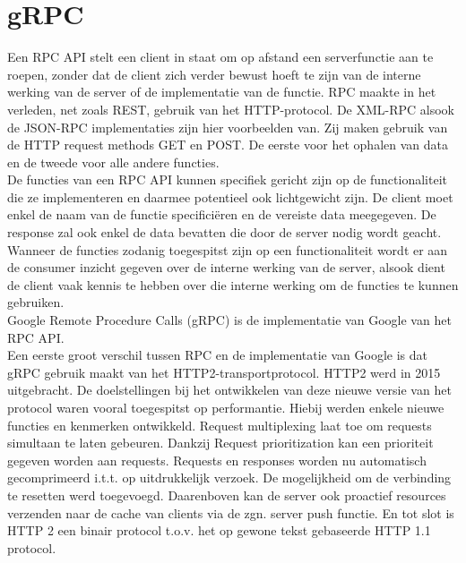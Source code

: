 \section{gRPC}

Een RPC API stelt een client in staat om op afstand een serverfunctie aan te roepen, zonder dat de client zich verder bewust hoeft te zijn van de interne werking
van de server of de implementatie van de functie.
RPC maakte in het verleden, net zoals REST, gebruik van het HTTP-protocol. De XML-RPC alsook de JSON-RPC implementaties zijn hier voorbeelden van.
Zij maken gebruik van de HTTP request methods GET en POST. De eerste voor het ophalen van data en de tweede voor alle andere functies.\\

De functies van een RPC API kunnen specifiek gericht zijn op de functionaliteit die ze implementeren en daarmee potentieel ook lichtgewicht zijn.
De client moet enkel de naam van de functie specificiëren en de vereiste data meegegeven. De response zal ook enkel de data bevatten die door de server nodig wordt geacht.
Wanneer de functies zodanig toegespitst zijn op een functionaliteit wordt er aan de consumer inzicht gegeven over de interne werking van de server,
alsook dient de client vaak kennis te hebben over die interne werking om de functies te kunnen gebruiken.\newline
~\autocite{altexsoft}\\

Google Remote Procedure Calls (gRPC) is de implementatie van Google van het RPC API.\\
Een eerste groot verschil tussen RPC en de implementatie van Google is dat gRPC gebruik maakt van het HTTP2-transportprotocol.
HTTP2 werd in 2015 uitgebracht. De doelstellingen bij het ontwikkelen van deze nieuwe versie van het protocol waren vooral toegespitst op performantie.
Hiebij werden enkele nieuwe functies en kenmerken ontwikkeld. Request multiplexing laat toe om requests simultaan te laten gebeuren.
Dankzij Request prioritization kan een prioriteit gegeven worden aan requests. Requests en responses worden nu automatisch gecomprimeerd i.t.t. op
uitdrukkelijk verzoek. De mogelijkheid om de verbinding te resetten werd toegevoegd. Daarenboven kan de server ook proactief resources verzenden naar de
cache van clients via de zgn. server push functie. En tot slot is HTTP 2 een binair protocol t.o.v. het op gewone tekst gebaseerde HTTP 1.1 protocol.\newline
~\autocite{baeldung}\\

